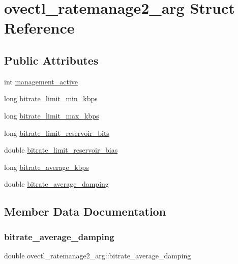 \hypertarget{structovectl__ratemanage2__arg}{}\section{ovectl\+\_\+ratemanage2\+\_\+arg Struct Reference}
\label{structovectl__ratemanage2__arg}
\subsection*{Public Attributes}
\begin{DoxyCompactItemize}
\item 
int \hyperlink{structovectl__ratemanage2__arg_aca1f656373a1597177dac924578e375b}{management\+\_\+active}
\item 
long \hyperlink{structovectl__ratemanage2__arg_aeb53a17fff14ec50d143602adfdeabeb}{bitrate\+\_\+limit\+\_\+min\+\_\+kbps}
\item 
long \hyperlink{structovectl__ratemanage2__arg_a175691482003edd7d94592fa2bc993a9}{bitrate\+\_\+limit\+\_\+max\+\_\+kbps}
\item 
long \hyperlink{structovectl__ratemanage2__arg_a75e496acac882e156137de9d1200ebd7}{bitrate\+\_\+limit\+\_\+reservoir\+\_\+bits}
\item 
double \hyperlink{structovectl__ratemanage2__arg_a5567fde1798b1e80e40a77565b4b44f4}{bitrate\+\_\+limit\+\_\+reservoir\+\_\+bias}
\item 
long \hyperlink{structovectl__ratemanage2__arg_a1f6bab60d87143d5060dd6c59aad6e71}{bitrate\+\_\+average\+\_\+kbps}
\item 
double \hyperlink{structovectl__ratemanage2__arg_a1069e148a884d8706928cd2e39870720}{bitrate\+\_\+average\+\_\+damping}
\end{DoxyCompactItemize}


\subsection{Member Data Documentation}
\mbox{\label{structovectl__ratemanage2__arg_a1069e148a884d8706928cd2e39870720}} 
\subsubsection{\texorpdfstring{bitrate\+\_\+average\+\_\+damping}{bitrate\_average\_damping}}
{\footnotesize\ttfamily double ovectl\+\_\+ratemanage2\+\_\+arg\+::bitrate\+\_\+average\+\_\+damping}

